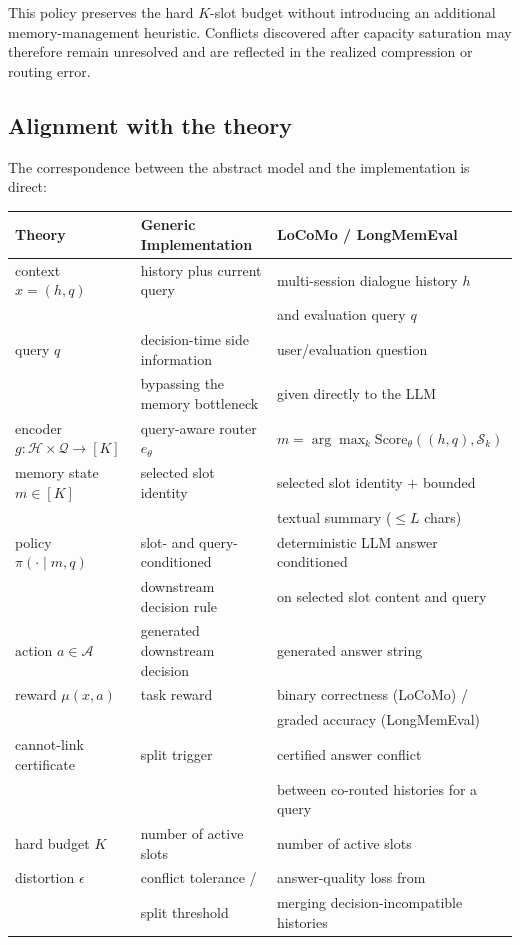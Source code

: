 \documentclass{article}
\theoremstyle{plain}
\theoremstyle{definition}
\theoremstyle{remark}
\newcommand{\cA}{\mathcal{A}}
\newcommand{\eps}{\epsilon}
\begin{document}
This policy preserves the hard \(K\)-slot budget without introducing an
additional memory-management heuristic. Conflicts discovered after capacity
saturation may therefore remain unresolved and are reflected in the realized
compression or routing error.

\subsection{Alignment with the theory}
\label{app:alignment-table}
The correspondence between the abstract model and the implementation is direct:
\begin{center}
\small
\begin{tabular}{lll}
\toprule
\textbf{Theory} & \textbf{Generic Implementation} & \textbf{LoCoMo / LongMemEval} \\
\midrule
context $x=(h,q)$ & history plus current query & multi-session dialogue history $h$ \\
 & & \quad and evaluation query $q$ \\[3pt]

query $q$ & decision-time side information & user/evaluation question \\
 & \quad bypassing the memory bottleneck & \quad given directly to the LLM \\[3pt]

encoder $g:\mathcal{H}\times\mathcal{Q}\to[K]$ & query-aware router $e_\theta$ &
$m=\arg\max_k\mathrm{Score}_\theta((h,q),\mathcal{S}_k)$ \\[3pt]

memory state $m\in[K]$ & selected slot identity & selected slot identity $+$ bounded \\
 & & \quad textual summary ($\leq L$ chars) \\[3pt]

policy $\pi(\cdot\mid m,q)$ & slot- and query-conditioned & deterministic LLM answer conditioned \\
 & \quad downstream decision rule & \quad on selected slot content and query \\[3pt]

action $a\in\cA$ & generated downstream decision & generated answer string \\[3pt]

reward $\mu(x,a)$ & task reward & binary correctness (LoCoMo) / \\
 & & \quad graded accuracy (LongMemEval) \\[3pt]

cannot-link certificate & split trigger & certified answer conflict \\
 & & \quad between co-routed histories for a query \\[3pt]

hard budget $K$ & number of active slots & number of active slots \\[3pt]

distortion $\eps$ & conflict tolerance / & answer-quality loss from \\
 & \quad split threshold & \quad merging decision-incompatible histories \\
\bottomrule
\end{tabular}
\end{center}
\end{document}
